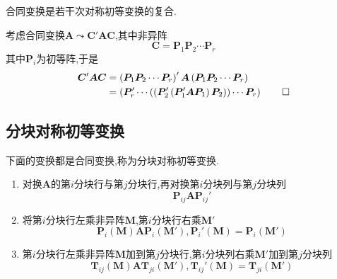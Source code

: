 \begin{green}
    \begin{corollary}[合同变换与对称初等变换]\label{cor:合同变换与对称初等变换}
        合同变换是若干次对称初等变换的复合.
    \end{corollary}
    \begin{Proof}
        考虑合同变换$\bm{A}\leadsto \bm{C}'\bm{AC}$,其中非异阵\[
        \bm{C}=\bm{P}_1\bm{P}_2\cdots\bm{P}_r
        \]其中$\bm{P}_i$为初等阵,于是\begin{align*}
        \bm{C}'\bm{AC}&=\left(
            \bm{P}_1\bm{P}_2\cdots\bm{P}_r
        \right)' \bm{A}\left(
            \bm{P}_1\bm{P}_2\cdots\bm{P}_r
            \right)\\
            &=\left(
                \bm{P}_r'\cdots\left(
                \left(
                    \bm{P}_2'\left(
                        \bm{P}_1'\bm{A}\bm{P}_1
                    \right)\bm{P}_2
                \right)
                \right)
                  \cdots  \bm{P}_r        \right)\qedhere
        \end{align*}
    \end{Proof}
\end{green}
\subsection{分块对称初等变换}
\begin{formal}
    \begin{definition}[分块对称初等变换的定义]\label{def:分块对称初等变换的定义}
        下面的变换都是合同变换,称为分块对称初等变换.
        \begin{enumerate}[label={\textup{(\arabic*)}}]
            \item 对换$\bm{A}$的第$i$分块行与第$j$分块行,再对换第$i$分块列与第$j$分块列\[
            \bm{P}_{ij}\bm{AP}_{ij}'
            \]
            \item 将第$i$分块行左乘非异阵$\bm{M}$,第$i$分块行右乘$\bm{M}'$\[
            \bm{P}_i\left(\bm{M}\right)\bm{AP}_i\left(\bm{M}'\right),\bm{P}_i'\left(\bm{M}\right)=\bm{P}_i\left(\bm{M}'\right)
            \]
            \item 第$i$分块行左乘非异阵$\bm{M}$加到第$j$分块行,第$i$分块列右乘$\bm{M}'$加到第$j$分块列\[
            \bm{T}_{ij}\left(\bm{M}\right)\bm{AT}_{ji}\left(\bm{M}'\right),\bm{T}_{ij}'\left(\bm{M}\right)=\bm{T}_{ji}\left(\bm{M}'\right)
            \]
        \end{enumerate}
    \end{definition}
\end{formal}
\newpage
